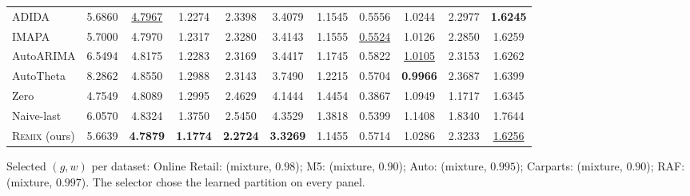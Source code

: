 \documentclass[twocolumn,10pt]{article}
\newcommand{\REMIX}{\textsc{Remix}}
\newcommand{\best}[1]{\textbf{#1}}
\newcommand{\secondbest}[1]{\underline{#1}}
\begin{document}
\begin{table}[t]
\begin{tabular}{lcc@{\hspace{10pt}}cc@{\hspace{10pt}}cc@{\hspace{10pt}}cc@{\hspace{10pt}}cc}
ADIDA & 5.6860 & \secondbest{4.7967} & 1.2274 & 2.3398 & 3.4079 & 1.1545 & 0.5556 & 1.0244 & 2.2977 & \best{1.6245}\\
IMAPA & 5.7000 & 4.7970 & 1.2317 & 2.3280 & 3.4143 & 1.1555 & \secondbest{0.5524} & 1.0126 & 2.2850 & 1.6259\\
AutoARIMA & 6.5494 & 4.8175 & 1.2283 & 2.3169 & 3.4417 & 1.1745 & 0.5822 & \secondbest{1.0105} & 2.3153 & 1.6262\\
AutoTheta & 8.2862 & 4.8550 & 1.2988 & 2.3143 & 3.7490 & 1.2215 & 0.5704 & \best{0.9966} & 2.3687 & 1.6399\\
\midrule
Zero & 4.7549 & 4.8089 & 1.2995 & 2.4629 & 4.1444 & 1.4454 & 0.3867 & 1.0949 & 1.1717 & 1.6345\\
Naive-last & 6.0570 & 4.8324 & 1.3750 & 2.5450 & 4.3529 & 1.3818 & 0.5399 & 1.1408 & 1.8340 & 1.7644\\
\midrule
\REMIX{} (ours) & 5.6639 & \best{4.7879} & \best{1.1774} & \best{2.2724} & \best{3.3269} & 1.1455 & 0.5714 & 1.0286 & 2.3233 & \secondbest{1.6256}\\
\bottomrule
\end{tabular}

\smallskip
{\footnotesize Selected $(g,w)$ per dataset: Online Retail:
(mixture, $0.98$); M5: (mixture, $0.90$); Auto: (mixture, $0.995$);
Carparts: (mixture, $0.90$); RAF: (mixture, $0.997$). The selector chose
the learned partition on every panel.}
\end{table}
\end{document}
